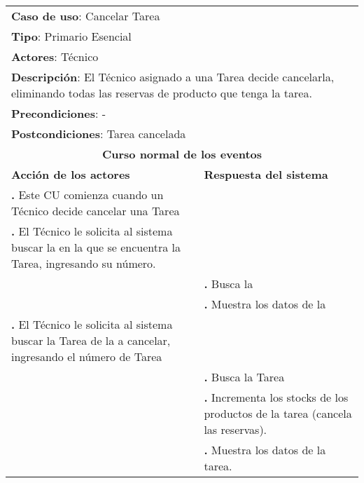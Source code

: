 \documentclass[12pt]{extarticle}
\begin{document}
    \newcommand\inc{\stepcounter{step}\textbf{\thestep. }}
    \newcommand\resetinc{\setcounter{step}{0}}
    \newcommand\raya{\noindent\rule{169mm}{0.8mm}\\}


	\begin{longtable}{ |p{8cm}|p{8cm}| }
		\hline
		\multicolumn{2}{|p{16cm}|}{\textbf{Caso de uso}: Cancelar Tarea}\\
		\multicolumn{2}{|p{16cm}|}{\textbf{Tipo}: Primario Esencial}\\
		\multicolumn{2}{|p{16cm}|}{\textbf{Actores}: Técnico}\\
		\multicolumn{2}{|p{16cm}|}{\textbf{Descripción}: El Técnico asignado a una Tarea decide cancelarla, eliminando todas las reservas de producto que tenga la tarea.}\\
		\multicolumn{2}{|p{16cm}|}{\textbf{Precondiciones}: -}\\
		\multicolumn{2}{|p{16cm}|}{\textbf{Postcondiciones}: Tarea cancelada}\\
		\hline
		\multicolumn{2}{|c|}{\textbf{Curso normal de los eventos}}\\
		\hline
		\textbf{Acción de los actores} & \textbf{Respuesta del sistema}\\
		\hline
            \inc Este CU comienza cuando un Técnico decide cancelar una Tarea& \\
            \hline
            \inc El Técnico le solicita al sistema buscar la \OT{} en la que se encuentra la Tarea, ingresando su número.& \\
            \hline
            & \inc Busca la \OT{}\\
            \hline
            & \inc Muestra los datos de la \OT{}\\
            \hline


            \inc El Técnico le solicita al sistema buscar la Tarea de la \OT{} a cancelar, ingresando el número de Tarea& \\
            \hline
            & \inc Busca la Tarea\\
            \hline
            & \inc Incrementa los stocks de los productos de la tarea (cancela las reservas).\\
            \hline
            & \inc Muestra los datos de la tarea.\\
            \hline



\end{longtable}
\end{document}
